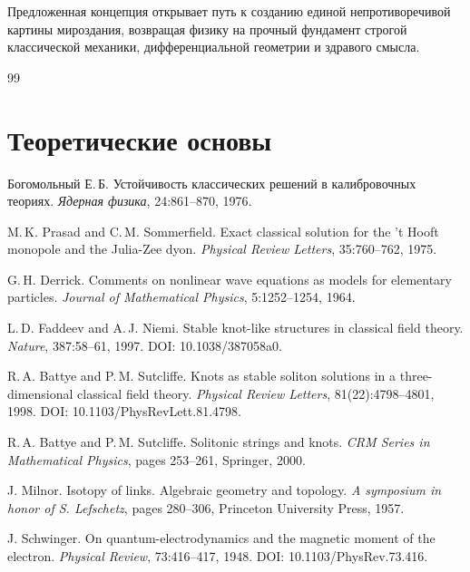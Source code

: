 \documentclass[11pt,a4paper]{article}
\begin{document}
	Предложенная концепция открывает путь к созданию единой непротиворечивой картины мироздания, возвращая физику на прочный фундамент строгой классической механики, дифференциальной геометрии и здравого смысла.
	
	\begin{thebibliography}{99}
		
		\section*{Теоретические основы}
		
		Богомольный Е.\,Б.
		\newblock Устойчивость классических решений в калибровочных теориях.
		\newblock \textit{Ядерная физика}, 24:861--870, 1976.
		
		M.\,K. Prasad and C.\,M. Sommerfield.
		\newblock Exact classical solution for the 't Hooft monopole and the Julia-Zee dyon.
		\newblock \textit{Physical Review Letters}, 35:760--762, 1975.
		
		G.\,H. Derrick.
		\newblock Comments on nonlinear wave equations as models for elementary particles.
		\newblock \textit{Journal of Mathematical Physics}, 5:1252--1254, 1964.
		
		L.\,D. Faddeev and A.\,J. Niemi.
		\newblock Stable knot-like structures in classical field theory.
		\newblock \textit{Nature}, 387:58--61, 1997.
		\newblock DOI: 10.1038/387058a0.
		
		R.\,A. Battye and P.\,M. Sutcliffe.
		\newblock Knots as stable soliton solutions in a three-dimensional classical field theory.
		\newblock \textit{Physical Review Letters}, 81(22):4798--4801, 1998.
		\newblock DOI: 10.1103/PhysRevLett.81.4798.
		
		R.\,A. Battye and P.\,M. Sutcliffe.
		\newblock Solitonic strings and knots.
		\newblock \textit{CRM Series in Mathematical Physics}, pages 253--261, Springer, 2000.
		
		J. Milnor.
		\newblock Isotopy of links. Algebraic geometry and topology.
		\newblock \textit{A symposium in honor of S. Lefschetz}, pages 280--306, Princeton University Press, 1957.
		
		J. Schwinger.
		\newblock On quantum-electrodynamics and the magnetic moment of the electron.
		\newblock \textit{Physical Review}, 73:416--417, 1948.
		\newblock DOI: 10.1103/PhysRev.73.416.
		

\end{thebibliography}
\end{document}
